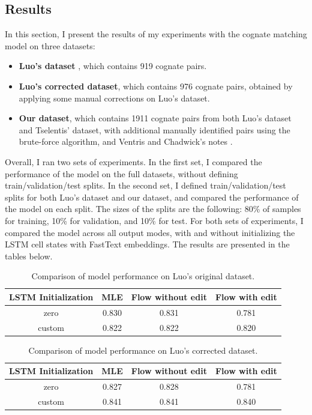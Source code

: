 \subsection{Results} \label{sec:results}
In this section, I present the results of my experiments with the cognate matching model on three datasets:
\begin{itemize}[leftmargin=2em]
    \item \textbf{Luo's dataset} \cite{luo}, which contains 919 cognate pairs.
    \item \textbf{Luo's corrected dataset}, which contains 976 cognate pairs, obtained by applying some manual corrections on Luo's dataset.
    \item \textbf{Our dataset}, which contains 1911 cognate pairs from both Luo's dataset and Tselentis' \cite{tselentis} dataset, with additional manually identified pairs using the brute-force algorithm, and Ventris and Chadwick's notes \cite{chadwick-notes}.
\end{itemize}

Overall, I ran two sets of experiments.
In the first set, I compared the performance of the model on the full datasets, without defining train/validation/test splits.
In the second set, I defined train/validation/test splits for both Luo's dataset and our dataset, and compared the performance of the model on each split.
The sizes of the splits are the following: 80\% of samples for training, 10\% for validation, and 10\% for test.
For both sets of experiments, I compared the model across all output modes, with and without initializing the LSTM cell states with FastText embeddings.
The results are presented in the tables below.

\begin{table}[h!]
\centering
\begin{tabular}{|c|c|c|c|}
\hline
\textbf{LSTM Initialization} & \textbf{MLE} & \textbf{Flow without edit} & \textbf{Flow with edit} \\
\hline
zero   & 0.830 & 0.831 & 0.781 \\
custom & 0.822 & 0.822 & 0.820 \\
\hline
\end{tabular}
\caption{Comparison of model performance on Luo's original dataset.}
\end{table}

\begin{table}[h!]
\centering
\begin{tabular}{|c|c|c|c|}
\hline
\textbf{LSTM Initialization} & \textbf{MLE} & \textbf{Flow without edit} & \textbf{Flow with edit} \\
\hline
zero   & 0.827 & 0.828 & 0.781 \\
custom & 0.841 & 0.841 & 0.840 \\
\hline
\end{tabular}
\caption{Comparison of model performance on Luo's corrected dataset.}
\end{table}

